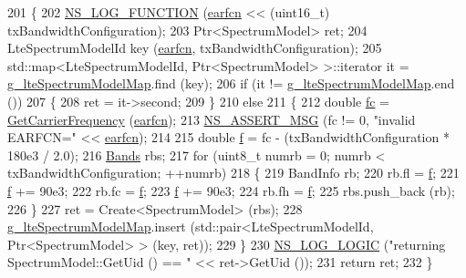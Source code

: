 \begin{DoxyCode}
201 \{
202   \hyperlink{log-macros-disabled_8h_a90b90d5bad1f39cb1b64923ea94c0761}{NS\_LOG\_FUNCTION} (\hyperlink{generate__test__data__lte__spectrum__model_8m_a584be7562abb392609629331f8c6c42c}{earfcn} << (uint16\_t) txBandwidthConfiguration);
203   Ptr<SpectrumModel> ret;
204   LteSpectrumModelId key (\hyperlink{generate__test__data__lte__spectrum__model_8m_a584be7562abb392609629331f8c6c42c}{earfcn}, txBandwidthConfiguration);
205   std::map<LteSpectrumModelId, Ptr<SpectrumModel> >::iterator it = 
      \hyperlink{namespacens3_a1e37494c3c56034a6030216a52f4be78}{g\_lteSpectrumModelMap}.find (key);
206   \textcolor{keywordflow}{if} (it != \hyperlink{namespacens3_a1e37494c3c56034a6030216a52f4be78}{g\_lteSpectrumModelMap}.end ())
207     \{
208       ret = it->second;
209     \}
210   \textcolor{keywordflow}{else}
211     \{
212       \textcolor{keywordtype}{double} \hyperlink{generate__test__data__lte__spectrum__model_8m_a72d54db2b27ce046aab6e6a414c407e9}{fc} = \hyperlink{classns3_1_1LteSpectrumValueHelper_a07e5a6638c218927b61da7b75ae0b786}{GetCarrierFrequency} (\hyperlink{generate__test__data__lte__spectrum__model_8m_a584be7562abb392609629331f8c6c42c}{earfcn});
213       \hyperlink{assert_8h_aff5ece9066c74e681e74999856f08539}{NS\_ASSERT\_MSG} (fc != 0, \textcolor{stringliteral}{"invalid EARFCN="} << \hyperlink{generate__test__data__lte__spectrum__model_8m_a584be7562abb392609629331f8c6c42c}{earfcn});
214 
215       \textcolor{keywordtype}{double} \hyperlink{buildings__pathloss_8m_aa52d3a6e3de5a80a97c12364caeaa125}{f} = fc - (txBandwidthConfiguration * 180e3 / 2.0);
216       \hyperlink{namespacens3_a46ac9188e5cf43bd5292f7b67451246e}{Bands} rbs;
217       \textcolor{keywordflow}{for} (uint8\_t numrb = 0; numrb < txBandwidthConfiguration; ++numrb)
218         \{
219           BandInfo rb; 
220           rb.fl = \hyperlink{buildings__pathloss_8m_aa52d3a6e3de5a80a97c12364caeaa125}{f};
221           \hyperlink{buildings__pathloss_8m_aa52d3a6e3de5a80a97c12364caeaa125}{f} += 90e3;
222           rb.fc = \hyperlink{buildings__pathloss_8m_aa52d3a6e3de5a80a97c12364caeaa125}{f};
223           \hyperlink{buildings__pathloss_8m_aa52d3a6e3de5a80a97c12364caeaa125}{f} += 90e3;
224           rb.fh = \hyperlink{buildings__pathloss_8m_aa52d3a6e3de5a80a97c12364caeaa125}{f};
225           rbs.push\_back (rb);
226         \}
227       ret = Create<SpectrumModel> (rbs);
228       \hyperlink{namespacens3_a1e37494c3c56034a6030216a52f4be78}{g\_lteSpectrumModelMap}.insert (std::pair<LteSpectrumModelId, Ptr<SpectrumModel> >
       (key, ret));
229     \}
230   \hyperlink{group__logging_ga88acd260151caf2db9c0fc84997f45ce}{NS\_LOG\_LOGIC} (\textcolor{stringliteral}{"returning SpectrumModel::GetUid () == "} << ret->GetUid ());
231   \textcolor{keywordflow}{return} ret;
232 \}
\end{DoxyCode}


